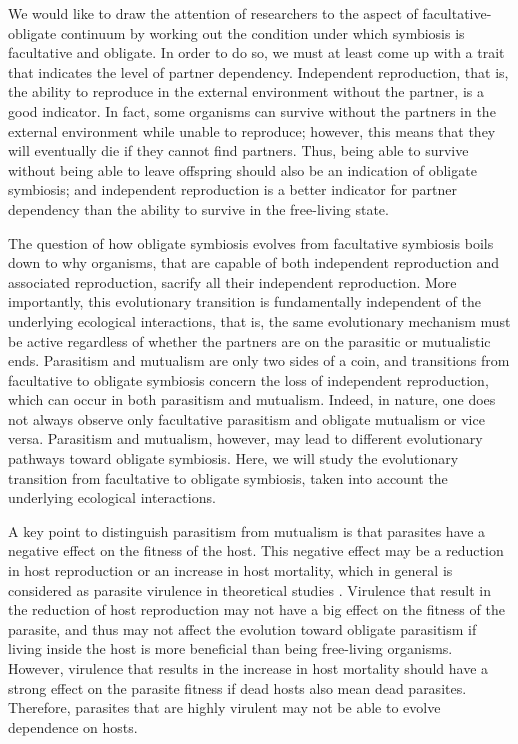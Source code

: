 \documentclass[11.5pt]{article}
\begin{document}
We would like to draw the attention of researchers to the aspect of facultative-obligate continuum by working out the condition under which symbiosis is facultative and obligate. In order to do so, we must at least come up with a trait that indicates the level of partner dependency. Independent reproduction, that is, the ability to reproduce in the external environment without the partner, is a good indicator. In fact, some organisms can survive without the partners in the external environment while unable to reproduce; however, this means that they will eventually die if they cannot find partners. Thus, being able to survive without being able to leave offspring should also be an indication of obligate symbiosis; and independent reproduction is a better indicator for partner dependency than the ability to survive in the free-living state.

\medskip

The question of how obligate symbiosis evolves from facultative symbiosis boils down to why organisms, that are capable of both independent reproduction and associated reproduction, sacrify all their independent reproduction. More importantly, this evolutionary transition is fundamentally independent of the underlying ecological interactions, that is, the same evolutionary mechanism must be active regardless of whether the partners are on the parasitic or mutualistic ends. Parasitism and mutualism are only two sides of a coin, and transitions from facultative to obligate symbiosis concern the loss of independent reproduction, which can occur in both parasitism and mutualism. Indeed, in nature, one does not always observe only facultative parasitism and obligate mutualism or vice versa. Parasitism and mutualism, however, may lead to different evolutionary pathways toward obligate symbiosis. Here, we will study the evolutionary transition from facultative to obligate symbiosis, taken into account the underlying ecological interactions.

\medskip

A key point to distinguish parasitism from mutualism is that parasites have a negative effect on the fitness of the host. This negative effect may be a reduction in host reproduction or an increase in host mortality, which in general is considered as parasite virulence in theoretical studies \parencite{Cressler2016}. Virulence that result in the reduction of host reproduction may not have a big effect on the fitness of the parasite, and thus may not affect the evolution toward obligate parasitism if living inside the host is more beneficial than being free-living organisms. However, virulence that results in the increase in host mortality should have a strong effect on the parasite fitness if dead hosts also mean dead parasites. Therefore, parasites that are highly virulent may not be able to evolve dependence on hosts. 
\end{document}
